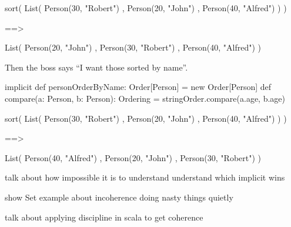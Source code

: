 \documentclass[usenames,dvipsnames,svgnames,table,aspectratio=169,mathserif]{beamer}
\newcommand{\nl}{\vspace{\baselineskip}}
\newcommand{\pnl}{\pause \nl}
\begin{document}
\begin{frame}[fragile]
\begin{scalacode}
sort(
  List(
    Person(30, "Robert")
  , Person(20, "John")
  , Person(40, "Alfred")
  )
)
\end{scalacode}

\pnl

\begin{scalacode}
==>

List(
  Person(20, "John")
, Person(30, "Robert")
, Person(40, "Alfred")
)
\end{scalacode}
\end{frame}


\begin{frame}[fragile]
Then the boss says ``I want those sorted by name''.

\pnl

\begin{scalacode}
implicit def personOrderByName: Order[Person] = new Order[Person] {
  def compare(a: Person, b: Person): Ordering =
    stringOrder.compare(a.age, b.age)
}
\end{scalacode}


\end{frame}


\begin{frame}[fragile]
\begin{scalacode}
sort(
  List(
    Person(30, "Robert")
  , Person(20, "John")
  , Person(40, "Alfred")
  )
)
\end{scalacode}

\pnl

\begin{scalacode}
==>

List(
  Person(40, "Alfred")
, Person(20, "John")
, Person(30, "Robert")
)

\end{scalacode}
\end{frame}


\begin{frame}
talk about how impossible it is to understand understand which implicit wins

\nl

show Set example about incoherence doing nasty things quietly

\nl

talk about applying discipline in scala to get coherence
\end{frame}
\end{document}
